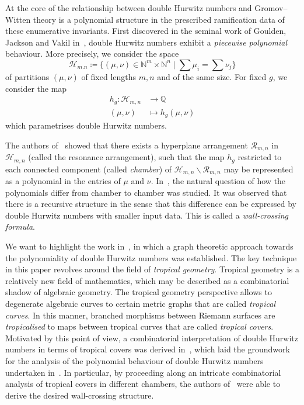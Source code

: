 \documentclass[11pt]{article}
\theoremstyle{definition}
\numberwithin{equation}{section}
\begin{document}
At the core of the relationship between double Hurwitz numbers and Gromov--Witten theory is a polynomial structure in the prescribed ramification data of these enumerative invariants. First discovered in the seminal work of Goulden, Jackson and Vakil in~\cite{GJV05}, double Hurwitz numbers exhibit a \textit{piecewise polynomial} behaviour. More precisely, we consider the space \begin{equation*}
    \mathcal{H}_{m.n}\coloneqq\{(\mu,\nu)\in\mathbb{N}^m\times\mathbb{N}^n\mid \sum \mu_i=\sum \nu_j\}
\end{equation*}
of partitions $(\mu,\nu)$ of fixed lengths $m,n$ and of the same size. For fixed $g$, we consider the map
\begin{align*}
    h_g\colon \mathcal{H}_{m,n}&\to\mathbb{Q}\\
    (\mu,\nu)&\mapsto h_g(\mu,\nu)
\end{align*}
which parametrises double Hurwitz numbers.

The authors of~\cite{GJV05} showed that there exists a hyperplane arrangement $\mathcal{R}_{m,n}$ in $\mathcal{H}_{m,n}$ (called the resonance arrangement), such that the map $h_g$ restricted to each connected component (called \textit{chamber}) of $\mathcal{H}_{m,n}\backslash\mathcal{R}_{m,n}$ may be represented as a polynomial in the entries of $\mu$ and $\nu$. In~\cite{SSV08, CJM11, Joh15}, the natural question of how the polynomials differ from chamber to chamber was studied. It was observed that there is a recursive structure in the sense that this difference can be expressed by double Hurwitz numbers with smaller input data. This is called a \textit{wall-crossing formula}.

We want to highlight the work in~\cite{CJM11}, in which a graph theoretic approach towards the polynomiality of double Hurwitz numbers was established. The key technique in this paper revolves around the field of \textit{tropical geometry}. Tropical geometry is a relatively new field of mathematics, which may be described as a combinatorial shadow of algebraic geometry. The tropical geometry perspective allows to degenerate algebraic curves to certain metric graphs that are called \textit{tropical curves}. In this manner, branched morphisms between Riemann surfaces are \textit{tropicalised} to maps between tropical curves that are called \textit{tropical covers}. Motivated by this point of view, a combinatorial interpretation of double Hurwitz numbers in terms of tropical covers was derived in~\cite{CJM10}, which laid the groundwork for the analysis of the polynomial behaviour of double Hurwitz numbers undertaken in~\cite{CJM11}. In particular, by proceeding along an intricate combinatorial analysis of tropical covers in different chambers, the authors of~\cite{CJM11} were able to derive the desired wall-crossing structure.
\end{document}
